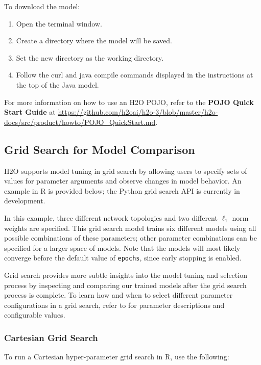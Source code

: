 {{To download the model:
\begin{enumerate}
\item Open the terminal window.
\item Create a directory where the model will be saved.
\item Set the new directory as the working directory.
\item Follow the curl and java compile commands displayed in the instructions at the top of the Java model.
\end{enumerate}

For more information on how to use an H2O POJO, refer to the \textbf{POJO Quick Start Guide} at {\url{https://github.com/h2oai/h2o-3/blob/master/h2o-docs/src/product/howto/POJO_QuickStart.md}}. 

\subsection{Grid Search for Model Comparison} 
\label{ssec:GridSearch}

H2O supports model tuning in  grid search by allowing users to specify sets of values for parameter arguments and observe changes in model behavior. An example in R is provided below; the Python grid search API is currently in development.   

In this example, three different network topologies and two different $\ell_1$ norm weights are specified. This grid search model trains six different models using all possible combinations of these parameters; other parameter combinations can be specified for a larger space of models. Note that the models will most likely converge before the default value of \texttt{epochs}, since early stopping is enabled.

Grid search provides more subtle insights into the model tuning and selection process by inspecting and comparing our trained models after the grid search process is complete. To learn how and when to select different parameter configurations in a grid search, refer to {\textbf{}} for parameter descriptions and configurable values. 

\subsubsection{Cartesian Grid Search}
To run a Cartesian hyper-parameter grid search in R, use the following:

\waterExampleInR


}}
